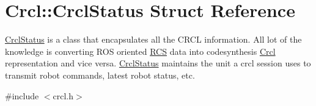 \hypertarget{structCrcl_1_1CrclStatus}{\section{Crcl\-:\-:Crcl\-Status Struct Reference}
\label{structCrcl_1_1CrclStatus}
}


\hyperlink{structCrcl_1_1CrclStatus}{Crcl\-Status} is a class that encapsulates all the C\-R\-C\-L information. All lot of the knowledge is converting R\-O\-S oriented \hyperlink{namespaceRCS}{R\-C\-S} data into codesynthesis \hyperlink{namespaceCrcl}{Crcl} representation and vice versa. \hyperlink{structCrcl_1_1CrclStatus}{Crcl\-Status} maintains the unit a crcl session uses to transmit robot commands, latest robot status, etc.  




{\ttfamily \#include $<$crcl.\-h$>$}

